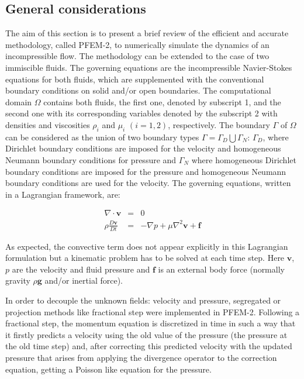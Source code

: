 \subsection{General considerations}\label{GeneralFor}

The aim of this section is to present a brief review of the efficient and accurate methodology, called PFEM-2, to numerically simulate the dynamics of an incompressible flow. The methodology can be extended to the case of two immiscible fluids. The governing equations are the incompressible Navier-Stokes equations for both fluids, which are supplemented with the conventional boundary conditions on solid and/or open boundaries. The computational domain $\Omega$ contains both fluids, the first one, denoted by subscript 1, and the second one with its corresponding variables denoted by the subscript 2 with densities and viscosities $\rho_i$ and $\mu_i$ $(i=1,2)$, respectively. The boundary $\Gamma$ of $\Omega$ can be considered as the union of two boundary types $\Gamma=\Gamma_D\bigcup\Gamma_N$: $\Gamma_D$, where Dirichlet boundary conditions are imposed for the velocity and homogeneous Neumann boundary conditions for pressure and $\Gamma_N$ where homogeneous Dirichlet boundary conditions are imposed for the pressure and homogeneous Neumann boundary conditions are used for the velocity. The governing equations, written in a Lagrangian framework, are:

\begin{eqnarray}
  \nabla \cdot \mathbf{v} &=& 0 \label{eq:continuity} \\
  \rho\frac{D\mathbf{v}}{Dt} &=& -\nabla p + \mu \nabla^2 \mathbf{v} + \mathbf{f}\label{eq:momentum}
\end{eqnarray}

As expected, the convective term does not appear explicitly in this Lagrangian formulation but a kinematic problem has to be solved at each time step. Here $\mathbf{v}$, $p$ are the velocity and fluid pressure and $\mathbf{f}$ is an external body force (normally gravity $\rho \mathbf{g}$ and/or inertial force).

In order to decouple the unknown fields: velocity and pressure, segregated or projection methods like fractional step were implemented in PFEM-2. Following a fractional step, the momentum equation is discretized in time in such a way that it firstly predicts a velocity using the old value of the pressure (the pressure at the old time step) and, after correcting this predicted velocity with the updated pressure that arises from applying the divergence operator to the correction equation, getting a Poisson like equation for the pressure.


